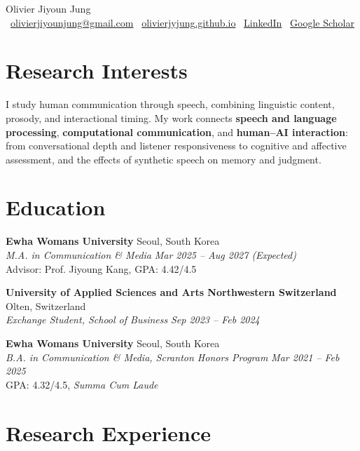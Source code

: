 \documentclass[11pt,a4paper]{article}
\newcommand{\headingfont}{\fontfamily{qpl}\fontseries{m}\selectfont}
\newcommand{\cventry}[4]{
    \noindent\textbf{#1} \hfill #2 \\[3pt]
    \textit{#3} \hfill \textit{#4}
}
\begin{document}
\begin{center}
    {\LARGE\headingfont Olivier Jiyoun Jung}\\[6pt]
    \faEnvelope\ \href{mailto:olivierjiyounjung@gmail.com}{olivierjiyounjung@gmail.com} \quad
    \faGlobe\ \href{https://olivierjyjung.github.io}{olivierjyjung.github.io} \quad
    \faLinkedin\ \href{https://www.linkedin.com/in/olivier-jiyoun-jung-290287389/}{LinkedIn} \quad
    \faGraduationCap\ \href{https://scholar.google.com/citations?user=fJh6efgAAAAJ}{Google Scholar}
\end{center}



\section{Research Interests}
I study human communication through speech, combining linguistic content, prosody, and interactional timing. My work connects \textbf{speech and language processing}, \textbf{computational communication}, and \textbf{human--AI interaction}: from conversational depth and listener responsiveness to cognitive and affective assessment, and the effects of synthetic speech on memory and judgment.

\section{Education}

\cventry{Ewha Womans University}{Seoul, South Korea}{M.A. in Communication \& Media}{Mar 2025 -- Aug 2027 (Expected)}\\
Advisor: Prof. Jiyoung Kang, GPA: 4.42/4.5
\vspace{10pt}

\cventry{University of Applied Sciences and Arts Northwestern Switzerland}{Olten, Switzerland}{Exchange Student, School of Business}{Sep 2023 -- Feb 2024}
\vspace{10pt}

\cventry{Ewha Womans University}{Seoul, South Korea}{B.A. in Communication \& Media, Scranton Honors Program}{Mar 2021 -- Feb 2025}\\
GPA: 4.32/4.5, \textit{Summa Cum Laude}

\section{Research Experience}
\end{document}
